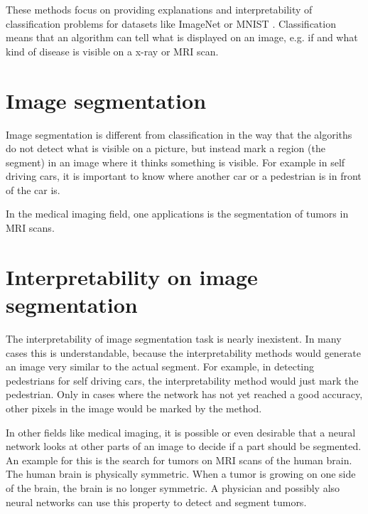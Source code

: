 These methods focus on providing explanations and interpretability of classification problems for datasets like ImageNet \cite{imagenet_cvpr09} or MNIST \cite{lecun1998gradient}. Classification means that an algorithm can tell what is displayed on an image, e.g. if and what kind of disease is visible on a x-ray or MRI scan.

\section{Image segmentation}
Image segmentation is different from classification in the way that the algoriths do not detect what is visible on a picture, but instead mark a region (the segment) in an image where it thinks something is visible. For example in self driving cars, it is important to know where another car or a pedestrian is in front of the car is. 

In the medical imaging field, one applications is the segmentation of tumors in MRI scans.

\section{Interpretability on image segmentation}
The interpretability of image segmentation task is nearly inexistent. In many cases this is understandable, because the interpretability methods would generate an image very similar to the actual segment. For example, in detecting pedestrians for self driving cars, the interpretability method would just mark the pedestrian. Only in cases where the network has not yet reached a good accuracy, other pixels in the image would be marked by the method.

In other fields like medical imaging, it is possible or even desirable that a neural network looks at other parts of an image to decide if a part should be segmented. An example for this is the search for tumors on MRI scans of the human brain. The human brain is physically symmetric. When a tumor is growing on one side of the brain, the brain is no longer symmetric. A physician and possibly also neural networks can use this property to detect and segment tumors.

